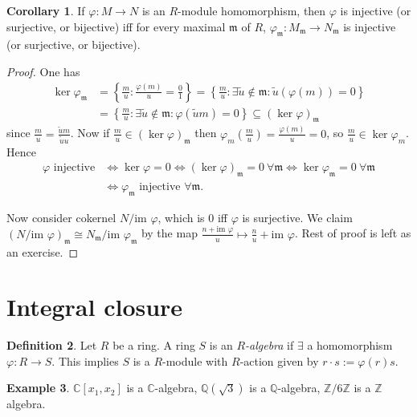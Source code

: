 \documentclass[a4paper]{article}
\newcommand{\m}{\mathfrak m}
\newcommand{\im}{\text{im }}
\theoremstyle{definition}
\newtheorem{defn}{Definition}[subsection]
\newtheorem{coro}[defn]{Corollary}
\newtheorem{example}[defn]{Example}
\begin{document}
\begin{coro}
If $\varphi:M\rightarrow N$ is an $R$-module homomorphism, then $\varphi$ is injective (or surjective, or bijective) iff for every maximal $\m$ of $R$, $\varphi_{\m}:M_\m \rightarrow N_\m$ is injective (or surjective, or bijective).
\end{coro}
\begin{proof}
One has
\[
\begin{aligned}
\ker\varphi_\m &= \left\{\frac{m}{u}:\frac{\varphi(m)}{u}=\frac01\right\} = \left\{\frac{m}{u}:\exists \widetilde u\notin \m:\widetilde u(\varphi(m))=0\right\} \\&= \left\{\frac{m}{u}:\exists \widetilde u\notin \m:\varphi(\widetilde um)=0\right\} \subseteq (\ker\varphi)_\m
\end{aligned}
\]
since $\displaystyle \frac{m}{u}=\frac{\widetilde um}{\widetilde uu}$. Now if $\displaystyle \frac{m}{u}\in(\ker\varphi)_\m$ then $\displaystyle \varphi_m\left(\frac{m}{u}\right)=\frac{\varphi(m)}{u}=0$, so $\displaystyle \frac{m}{u}\in\ker\varphi_m$. Hence
\[
\begin{aligned}
\varphi\text{ injective} &\Leftrightarrow \ker\varphi=0 \Leftrightarrow (\ker\varphi)_\m=0 \ \forall \m \Leftrightarrow \ker\varphi_\m=0 \ \forall \m \\&\Leftrightarrow \varphi_\m\text{ injective } \forall \m.
\end{aligned}
\]

Now consider cokernel $N/\im\varphi$, which is $0$ iff $\varphi$ is surjective. We claim $(N/\im\varphi)_\m \cong N_\m/\im\varphi_\m$ by the map $\displaystyle \frac{n+\im\varphi}{u}\mapsto\frac{n}{u}+\im\varphi$. Rest of proof is left as an exercise.
\end{proof}

\section{Integral closure}
\begin{defn}
Let $R$ be a ring. A ring $S$ is an $R$\textit{-algebra} if $\exists$ a homomorphism $\varphi:R\rightarrow S$. This implies $S$ is a $R$-module with $R$-action given by $r\cdot s:=\varphi(r)s$.
\end{defn}
\begin{example}
$\mathbb C[x_1,x_2]$ is a $\mathbb C$-algebra, $\mathbb Q\left(\sqrt 3\right)$ is a $\mathbb Q$-algebra, $\mathbb Z/6\mathbb Z$ is a $\mathbb Z$ algebra.
\end{example}
\end{document}
